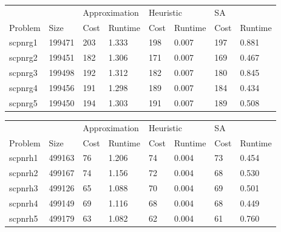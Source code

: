 \begin{table}[]
\centering
\begin{tabular}{@{}llllllll@{}}
\toprule
        &        & \multicolumn{2}{l}{Approximation} & \multicolumn{2}{l}{Heuristic} & \multicolumn{2}{l}{SA} \\
Problem & Size   & Cost           & Runtime          & Cost         & Runtime        & Cost     & Runtime     \\ \midrule
scpnrg1 & 199471 & 203            & 1.333            & 198          & 0.007          & 197      & 0.881       \\
scpnrg2 & 199451 & 182            & 1.306            & 171          & 0.007          & 169      & 0.467       \\
scpnrg3 & 199498 & 192            & 1.312            & 182          & 0.007          & 180      & 0.845       \\
scpnrg4 & 199456 & 191            & 1.298            & 189          & 0.007          & 184      & 0.434       \\
scpnrg5 & 199450 & 194            & 1.303            & 191          & 0.007          & 189      & 0.508       \\ \bottomrule
\end{tabular}
\end{table}

\begin{table}[]
\centering
\begin{tabular}{@{}llllllll@{}}
\toprule
        &        & \multicolumn{2}{l}{Approximation} & \multicolumn{2}{l}{Heuristic} & \multicolumn{2}{l}{SA} \\
Problem & Size   & Cost           & Runtime          & Cost         & Runtime        & Cost     & Runtime     \\ \midrule
scpnrh1 & 499163 & 76             & 1.206            & 74           & 0.004          & 73       & 0.454       \\
scpnrh2 & 499167 & 74             & 1.156            & 72           & 0.004          & 68       & 0.530       \\
scpnrh3 & 499126 & 65             & 1.088            & 70           & 0.004          & 69       & 0.501       \\
scpnrh4 & 499149 & 69             & 1.116            & 68           & 0.004          & 68       & 0.449       \\
scpnrh5 & 499179 & 63             & 1.082            & 62           & 0.004          & 61       & 0.760       \\ \bottomrule
\end{tabular}
\end{table}
